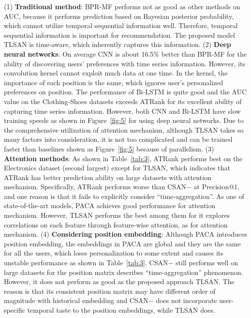 \documentclass[preprint,12pt]{elsarticle}
\newcommand{\tool}{TLSAN\xspace}
\begin{document}
\begin{sloppypar}
(1) \textbf{Traditional method}: BPR-MF performs not as good as other methods on AUC, because it performs prediction based on Bayesian posterior probability, which cannot utilize temporal sequential information well. Therefore, temporal sequential information is important for recommendation. The proposed model \tool is time-aware, which inherently captures this information. 
(2) \textbf{Deep neural networks}: On average CNN is about 16.5\% better than BPR-MF for the ability of discovering users' preferences with time series information. However, its convolution kernel cannot exploit much data at one time. In the kernel, the importance of each position is the same, which ignores user's personalized preferences on position. The performance of Bi-LSTM is quite good and the AUC value on the Clothing-Shoes datasets exceeds ATRank for its excellent ability of capturing time series information. However, both CNN and Bi-LSTM have slow training speeds as shown in Figure~\ref{fig:5} for using deep neural networks. Due to the comprehensive utilization of attention mechanism, although \tool takes so many factors into consideration, it is not too complicated and can be trained faster than baselines shown as Figure~\ref{fig:5} because of parallelism. 
(3) \textbf{Attention methods}: As shown in Table~\ref{tab:3}, ATRank performs best on the Electronics dataset (second largest) except for \tool, which indicates that ATRank has better prediction ability on large datasets with attention mechanism. Specifically, ATRank performs worse than CSAN$-$ at Precision@1, and one reason is that it fails to explicitly consider ``time-aggregation''. As one of state-of-the-art models, PACA achieves good performance for attention mechanism. However, \tool performs the best among them for it explores correlations on each feature through feature-wise attention, as for attention mechanism. 
(4) \textbf{Considering position embedding}: Although PACA introduces position embedding, the embeddings in PACA are global and they are the same for all the users, which loses personalization to some extent and causes its unstable performance as shown in Table~\ref{tab:3}. CSAN$-$ still performs well on large datasets for the position matrix describes ``time-aggregation'' phenomenon. However, it does not perform as good as the proposed approach \tool. The reason is that its consistent position matrix may have different order of magnitude with historical embedding and CSAN$-$ does not incorporate user-specific temporal taste to the position embeddings, while \tool does. 

\end{sloppypar}
\end{document}
